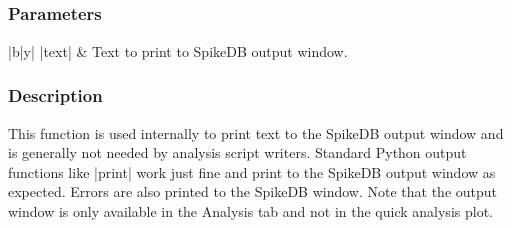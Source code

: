 \documentclass{report}
\begin{document}
\subsection{}
\subsection{}
\subsection{}
\subsection{}
\subsection{}
\subsection{}
\subsection{}
\subsection{}
\subsubsection{Parameters}
\begin{center}
\begin{tabular}{|b|y|}
	\hline
	|text| & Text to print to SpikeDB output window.\\
	\hline
\end{tabular}
\end{center}
\subsubsection{Description}
This function is used internally to print text to the SpikeDB output window and is generally not needed by analysis script writers. Standard Python output functions like |print| work just fine and print to the SpikeDB output window as expected. Errors are also printed to the SpikeDB window. Note that the output window is only available in the Analysis tab and not in the quick analysis plot.
\end{document}
